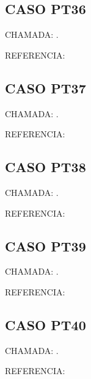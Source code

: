 \documentclass{undftex}
\begin{document}
\begin{refsection}\section*{CASO PT36} CHAMADA: . \textcite{pt36}\par REFERENCIA:\par\printbibliography[heading=none,check=undfconsultadas]\end{refsection}\clearpage
\begin{refsection}\section*{CASO PT37} CHAMADA: . \textcite{pt37}\par REFERENCIA:\par\printbibliography[heading=none,check=undfconsultadas]\end{refsection}\clearpage
\begin{refsection}\section*{CASO PT38} CHAMADA: . \textcite{pt38}\par REFERENCIA:\par\printbibliography[heading=none,check=undfconsultadas]\end{refsection}\clearpage
\begin{refsection}\section*{CASO PT39} CHAMADA: . \textcite{pt39}\par REFERENCIA:\par\printbibliography[heading=none,check=undfconsultadas]\end{refsection}\clearpage
\begin{refsection}\section*{CASO PT40} CHAMADA: . \textcite{pt40}\par REFERENCIA:\par\printbibliography[heading=none,check=undfconsultadas]\end{refsection}\clearpage
\end{document}
